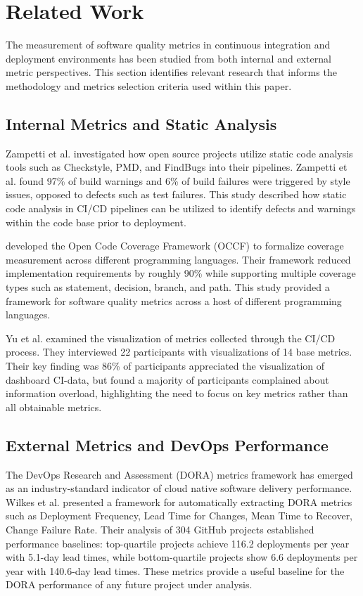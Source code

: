 \documentclass[12pt]{article}
\begin{document}
\section{Related Work}
The measurement of software quality metrics in continuous integration
and deployment
environments has been studied from both internal and external
metric perspectives. This section identifies relevant research that
informs the methodology
and metrics selection criteria used within this paper.

\subsection{Internal Metrics and Static Analysis}

Zampetti et al.
\cite{zampetti2017static} investigated how open source projects utilize static
code analysis tools such as Checkstyle, PMD, and FindBugs into their
pipelines. Zampetti et al.
found 97\% of build warnings and 6\% of build failures were triggered
by style issues,
opposed to defects such as test failures. This study described how
static code analysis in
CI/CD pipelines can be utilized to identify defects and warnings
within the code base prior to deployment.

\cite{sakamoto2010open} developed the Open Code Coverage Framework (OCCF)
to formalize coverage measurement across different programming
languages. Their framework
reduced implementation requirements by roughly 90\% while supporting
multiple coverage
types such as statement, decision, branch, and path. This study
provided a framework for
software quality metrics across a host of different programming languages.

Yu et al. \cite{yu2024roadmap} examined the visualization of metrics
collected through the CI/CD process. They interviewed 22 participants with
visualizations of 14 base metrics. Their key finding was 86\% of participants
appreciated the visualization of dashboard CI-data, but found a majority of
participants complained about information overload, highlighting the need
to focus on key metrics rather than all obtainable metrics.

\subsection{External Metrics and DevOps Performance}

The DevOps Research and Assessment (DORA) metrics framework has emerged
as an industry-standard indicator of cloud native software delivery performance.
Wilkes et al. \cite{wilkes2023framework} presented a framework for
automatically extracting DORA metrics such as Deployment Frequency, Lead
Time for Changes, Mean Time to Recover, Change Failure Rate. Their analysis of
304 GitHub projects established performance baselines: top-quartile
projects achieve 116.2
deployments per year with 5.1-day lead times, while bottom-quartile
projects show 6.6 deployments per year with 140.6-day lead times. These metrics
provide a useful baseline for the DORA performance of any future
project under analysis.
\end{document}
